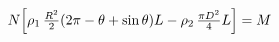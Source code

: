 \documentclass[preview]{standalone}
\begin{document}
\begin{align*}
N \Bigl[\rho_1\,\tfrac{R^2}{2}(2\pi-\theta+\sin\theta)L - \rho_2\,\tfrac{\pi D^2}{4}L \Bigr] = M
\end{align*}
\end{document}
